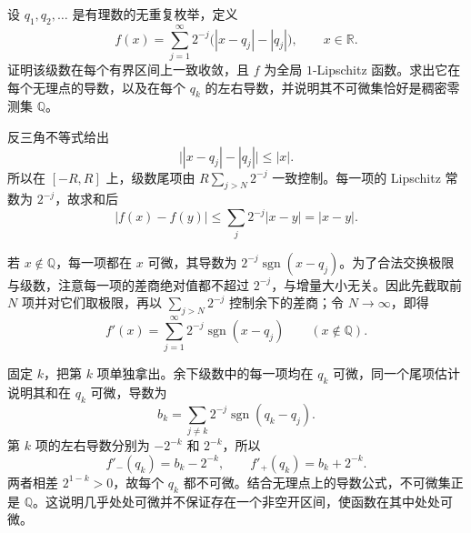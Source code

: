 \begin{exercise}\label{g3:ex:lipschitz-dense-corners}
	设 \(q_1,q_2,\ldots\) 是有理数的无重复枚举，定义
	\[
		f(x)=\sum_{j=1}^\infty2^{-j}\bigl(|x-q_j|-|q_j|\bigr),
		\qquad x\in\mathbb R.
	\]
	证明该级数在每个有界区间上一致收敛，且 \(f\) 为全局 \(1\)-Lipschitz 函数。求出它在每个无理点的导数，以及在每个 \(q_k\) 的左右导数，并说明其不可微集恰好是稠密零测集 \(\mathbb Q\)。
\end{exercise}
\begin{solution}
	反三角不等式给出
	\[
		\bigl||x-q_j|-|q_j|\bigr|\le|x|.
	\]
	所以在 \([-R,R]\) 上，级数尾项由 \(R\sum_{j>N}2^{-j}\) 一致控制。每一项的 Lipschitz 常数为 \(2^{-j}\)，故求和后
	\[
		|f(x)-f(y)|\le\sum_j2^{-j}|x-y|=|x-y|.
	\]

	若 \(x\notin\mathbb Q\)，每一项都在 \(x\) 可微，其导数为 \(2^{-j}\operatorname{sgn}(x-q_j)\)。为了合法交换极限与级数，注意每一项的差商绝对值都不超过 \(2^{-j}\)，与增量大小无关。因此先截取前 \(N\) 项并对它们取极限，再以 \(\sum_{j>N}2^{-j}\) 控制余下的差商；令 \(N\to\infty\)，即得
	\[
		f'(x)=\sum_{j=1}^\infty2^{-j}\operatorname{sgn}(x-q_j)
		\qquad(x\notin\mathbb Q).
	\]

	固定 \(k\)，把第 \(k\) 项单独拿出。余下级数中的每一项均在 \(q_k\) 可微，同一个尾项估计说明其和在 \(q_k\) 可微，导数为
	\[
		b_k=\sum_{j\ne k}2^{-j}\operatorname{sgn}(q_k-q_j).
	\]
	第 \(k\) 项的左右导数分别为 \(-2^{-k}\) 和 \(2^{-k}\)，所以
	\[
		f'_-(q_k)=b_k-2^{-k},\qquad
		f'_+(q_k)=b_k+2^{-k}.
	\]
	两者相差 \(2^{1-k}>0\)，故每个 \(q_k\) 都不可微。结合无理点上的导数公式，不可微集正是 \(\mathbb Q\)。这说明几乎处处可微并不保证存在一个非空开区间，使函数在其中处处可微。
\end{solution}

